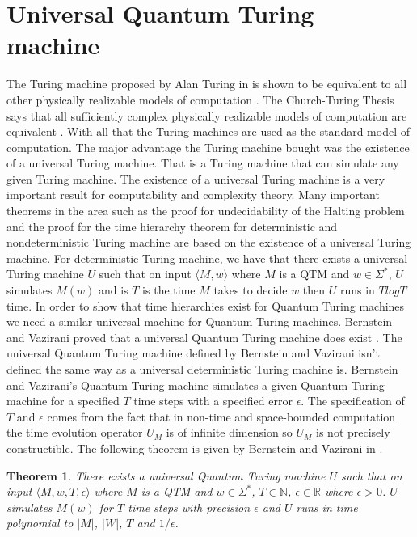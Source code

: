 \documentclass[11pt,a4paper]{article}
\newtheorem{theorem}{Theorem}
\begin{document}
\section{Universal Quantum Turing machine}
    The Turing machine proposed by Alan Turing in \cite{11} is shown to be equivalent to all other physically realizable models of computation \cite{10}\cite{20}\cite{21}\cite{22}. 
    The Church-Turing Thesis says that all sufficiently complex physically realizable models of computation are equivalent \cite{10}\cite{8}. With all that the Turing machines are used as the standard model of computation.
    The major advantage the Turing machine bought was the existence of a universal Turing machine. That is a Turing machine that can simulate any given Turing machine. 
    The existence of a universal Turing machine is a very important result for computability and complexity theory. Many important theorems in the area such as the proof for undecidability of the Halting problem and the proof for the time hierarchy theorem for deterministic and nondeterministic Turing machine are based on the existence of a universal Turing machine.
    For deterministic Turing machine, we have that there exists a universal Turing machine $U$ such that on input $\langle M,w\rangle$ where $M$ is a QTM and $w\in \Sigma^*$,
    $U$ simulates $M(w)$ and is $T$ is the time $M$ takes to decide $w$ then $U$ runs in $TlogT$ time. In order to show that time hierarchies exist for Quantum Turing machines we need a similar universal machine for Quantum Turing machines.
    Bernstein and Vazirani proved that a universal Quantum Turing machine does exist \cite{5}. The universal Quantum Turing machine defined by Bernstein and Vazirani isn't defined the same way as a universal deterministic Turing machine is. 
    Bernstein and Vazirani's Quantum Turing machine simulates a given Quantum Turing machine for a specified $T$ time steps with a specified error $\epsilon$. The specification of $T$ and $\epsilon$ comes from the fact that in non-time and space-bounded computation the time evolution operator $U_M$ is of infinite dimension so $U_M$ is not precisely constructible.
    The following theorem is given by Bernstein and Vazirani in \cite{5}.
    \begin{theorem}
        There exists a universal Quantum Turing machine $U$ such that on input 
        $\langle M,w,T,\epsilon \rangle$ where $M$ is a QTM and $w\in \Sigma^*$, $T \in \mathbb{N}$, $\epsilon \in \mathbb{R}$ where $\epsilon > 0$.
        $U$ simulates $M(w)$ for $T$ time steps with precision $\epsilon$ and $U$ runs in time polynomial to $|M|$, $|W|$, $T$ and $1/\epsilon$.
    \end{theorem}
\end{document}
